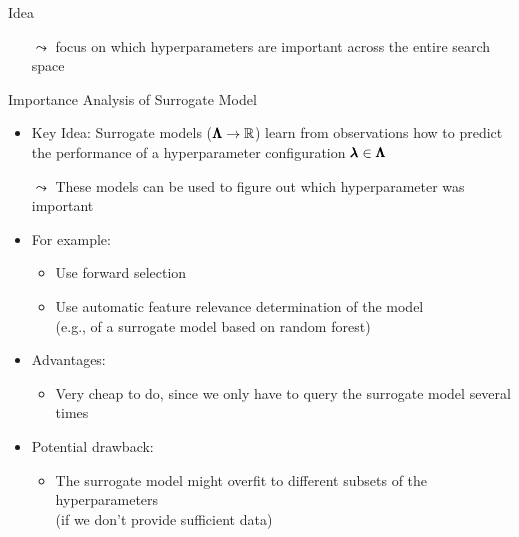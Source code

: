 \begin{frame}[c,fragile]{Idea}

\begin{center}
\scalebox{0.9}{
	 \let\oldpause=\pause \def\pause{} 
	
	\let\pause=\oldpause
}
\end{center}


\begin{itemize}
	\item[$\leadsto$] focus on which hyperparameters are important across the entire search space
\end{itemize}

\end{frame}
\begin{frame}[c,fragile]{Importance Analysis of Surrogate Model}

\begin{itemize}
	\item \alert{Key Idea}: Surrogate models ($\pmb{\Lambda} \to \mathbb{R}$) learn from observations how to predict the performance of a \alert{hyperparameter configuration} $\pmb{\lambda} \in \pmb{\Lambda}$
	\pause
	\item[$\leadsto$] These models can be used to figure out which hyperparameter was important
	\medskip
	\pause
	\item For example:
	\begin{itemize}
		\item Use forward selection~
        \item Use automatic feature relevance determination of the model\\
         (e.g., of a surrogate model based on random forest)
	\end{itemize}
	\medskip
	\pause
	\item Advantages:
	\begin{itemize}
		\item Very cheap to do, since we only have to query the surrogate model several times
	\end{itemize}
	\smallskip
	\pause
	\item Potential drawback:
	\begin{itemize}
		\item The surrogate model might overfit to different subsets of the hyperparameters\\
		(if we don't provide sufficient data)
	\end{itemize}

\end{itemize}

\end{frame}
